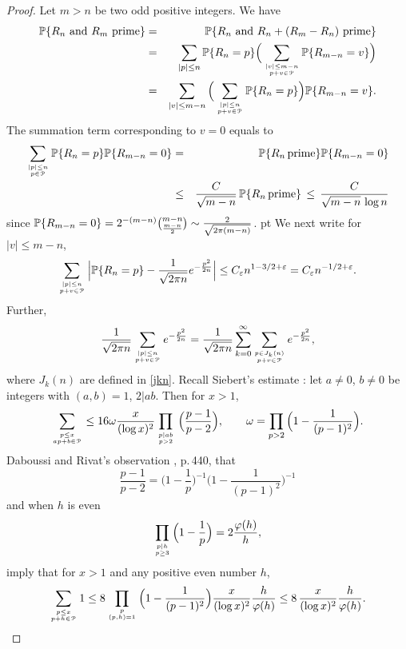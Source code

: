 \documentclass[11pt,draft,reqno]{amsart}
\theoremstyle{definition}
\theoremstyle{remarks}
\numberwithin{equation}{section}
\def \e{{\varepsilon}}
\def \o{{\omega}}
\def \p{{\varphi}}
\def \qq{{\qquad}}
\def\P{{\mathcal P}}
\def\P{{\mathbb P}}
\begin{document}
  
\begin{proof}  Let  $m>n$ be two odd positive integers. We have
\begin{eqnarray}\label{P-RnRm.1}\P\{R_n\ {\rm and} \ R_m\hbox{ prime} \}&=&\P\{R_n\ {\rm and} \ R_n +(R_m-R_n)\ \hbox{prime} \}
\cr &=& \sum_{|p|\le  n}\P\{R_n=p \}\Big(\sum_{|v|\le m-n\atop
p+v\in {\mathcal P}} \P\{R_{m-n}=v \}\Big)
\cr &=&\sum_{|v|\le m-n}\Big(\sum_{|p|\le  n\atop
p+v\in {\mathcal P}}\P\{R_n=p \}\Big)\P\{R_{m-n}=v \}.
\end{eqnarray} 
The summation term corresponding to $v=0$ equals to
\begin{eqnarray}\label{v=0} \sum_{|p|\le  n\atop
p \in {\mathcal P}}\P\{R_n=p \} \P\{R_{m-n}=0 \}& =&\P\{R_n  \, \hbox{prime}\} \P\{R_{m-n}=0 \} 
\cr &\le& {C\over \sqrt{ m-n } }\,\P\{R_n  \, \hbox{prime}\}   \,\le \,  {C\over \sqrt{ m-n } \,\log n}
\end{eqnarray} 
since $\P\{R_{m-n}=0 \}=2^{-(m-n)}{{m-n}\choose{{ m-n\over2}}}\sim{2\over \sqrt{2\pi(m-n)}}$.
 pt We next write for $|v|\le m-n$,
$$ \sum_{|p|\le  n\atop
p+v\in {\mathcal P}}\Big|\P\{R_n=p \}-{1\over  \sqrt{ 2\pi n}}   e^{-  {p^2\over  2 n } } \Big|\le C_\e n^{1-3/2+\e}= C_\e n^{-1/2+\e}.$$
Further,
$$  {1\over  \sqrt{ 2\pi n}} \sum_{|p|\le  n\atop
p+v\in {\mathcal P}}  e^{-  {p^2\over  2 n } } = {1\over  \sqrt{ 2\pi n}} \sum_{k=0}^\infty \sum_{p\in J_k(n)\atop
p+v\in {\mathcal P}} e^{-  {p^2\over  2 n } },$$
where $J_k(n)$ are defined in \eqref{jkn}. Recall  Siebert's estimate \cite{Si}: let $a\neq0$, $b\neq 0$ be integers with $(a,b)=1$, $2|ab$. Then for $x>1$,
 \begin{equation}\label{Siebert.est.}
\sum_{p\le x \atop   ap+b\in {\mathcal P} }\le 16\o{x \over (\log x)^2}  \prod_{p|ab\atop p>2}\, \Big({p-1\over p-2}\Big), \qq \o= \prod_{p>2}\Big(1-\frac{1}{(p-1)^2}\Big) .
\end{equation}
   Daboussi and   Rivat's observation  \cite{DR}, p.\,440, that
$$\frac{p-1}{p-2}= \Big(1-\frac{1}{p}\Big)^{-1}  \Big(1-\frac{1}{(p-1)^2}\Big)^{-1} $$   
and when $h$ is even
$$\prod_{p|h\atop p\ge 3}\Big(1-\frac{1}{p}\Big) = 2\frac{\p(h)}{h}, 
$$ 
imply 
that for $x>1$ and  any positive even number $h$,
\begin{equation}\label{Siebert.est}
\sum_{p\le x \atop    p+h\in {\mathcal P} }1\le 8\prod_{p\atop (p,h)=1}\Big(1-\frac{1}{(p-1)^2}\Big){ x\over (\log x)^2} {h\over \p(h)} \le 8\,{ x\over (\log x)^2} {h\over \p(h)} .\end{equation}


\end{proof}
\end{document}
